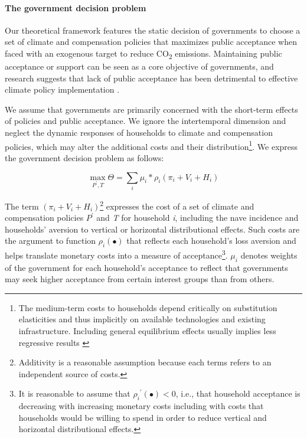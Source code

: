 \documentclass[12pt, a4paper]{article}
\begin{document}
\paragraph{The government decision problem}
Our theoretical framework features the static decision of governments to choose a set of climate and compensation policies that maximizes public acceptance when faced with an exogenous target to reduce CO\textsubscript{2} emissions. Maintaining public acceptance or support can be seen as a core objective of governments, and research suggests that lack of public acceptance has been detrimental to effective climate policy implementation \autocite{Carattini.2018,Bergquist.2022,Douenne.2022}.

We assume that governments are primarily concerned with the short-term effects of policies and public acceptance. We ignore the intertemporal dimension and neglect the dynamic responses of households to climate and compensation policies, which may alter the additional costs and their distribution\footnote{The medium-term costs to households depend critically on substitution elasticities and thus implicitly on available technologies and existing infrastructure. Including general equilibrium effects usually implies less regressive results \autocite{Ohlendorf.2021,Drupp.2024}}. We express the government decision problem as follows:  

\begin{equation} \label{eq:theta}
    \max_{P^{\prime},T} \Theta = \sum_{i} \mu_{i} * \rho_{i}(\pi_{i} + V_{i} + H_{i})
\end{equation}

The term $(\pi_{i} + V_{i} + H_{i})$\footnote{Additivity is a reasonable assumption because each terms refers to an independent source of costs.} expresses the cost of a set of climate and compensation policies $P^{\prime}$ and \textit{T} for household \textit{i}, including the nave incidence and households' aversion to vertical or horizontal distributional effects. Such costs are the argument to function $\rho_{i}(\bullet)$ that reflects each household's loss aversion \autocite{Tversky.1991} and helps translate monetary costs into a measure of acceptance\footnote{It is reasonable to assume that ${\rho_{i}}^{\prime}(\bullet)<0$, i.e., that household acceptance is decreasing with increasing monetary costs including with costs that households would be willing to spend in order to reduce vertical and horizontal distributional effects.}. $\mu_{i}$ denotes weights of the government for each household's acceptance to reflect that governments may seek higher acceptance from certain interest groups than from others.
\end{document}
